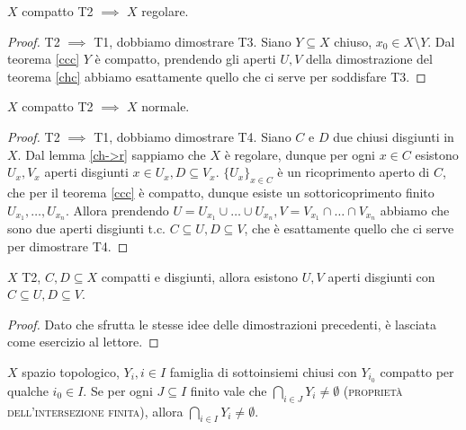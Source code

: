 \begin{lm} \label{ch->r}
  $X$ compatto T2 $\implies$ $X$ regolare.
\end{lm}

\begin{proof}
  T2 $\implies$ T1, dobbiamo dimostrare T3. Siano $Y \subseteq X$ chiuso, $x_0 \in X \setminus Y$. Dal teorema \ref{ccc} $Y$ è compatto, prendendo gli aperti $U, V$ della dimostrazione del teorema \ref{chc} abbiamo esattamente quello che ci serve per soddisfare T3.
\end{proof}

\begin{thm} \label{ch->n}
  $X$ compatto T2 $\implies$ $X$ normale.
\end{thm}

\begin{proof}
  T2 $\implies$ T1, dobbiamo dimostrare T4. Siano $C$ e $D$ due chiusi disgiunti in $X$. Dal lemma \ref{ch->r} sappiamo che $X$ è regolare, dunque per ogni $x \in C$ esistono $U_x, V_x$ aperti disgiunti $x \in U_x, D \subseteq V_x$. $\{U_x\}_{x \in C}$ è un ricoprimento aperto di $C$, che per il teorema \ref{ccc} è compatto, dunque esiste un sottoricoprimento finito $U_{x_1}, \dots, U_{x_n}$.
  Allora prendendo $U=U_{x_1} \cup \dots \cup U_{x_n}, V=V_{x_1} \cap \dots \cap V_{x_n}$ abbiamo che sono due aperti disgiunti t.c. $C \subseteq U, D \subseteq V$, che è esattamente quello che ci serve per dimostrare T4.
\end{proof}

\begin{prop}
  $X$ T2, $C, D \subseteq X$ compatti e disgiunti, allora esistono $U, V$ aperti disgiunti con $C \subseteq U, D \subseteq V$.
\end{prop}

\begin{proof}
  Dato che sfrutta le stesse idee delle dimostrazioni precedenti, è lasciata come esercizio al lettore.
\end{proof}

\begin{thm} \label{pif}
  $X$ spazio topologico, $Y_i, i \in I$ famiglia di sottoinsiemi chiusi con $Y_{i_0}$ compatto per qualche $i_0 \in I$. Se per ogni $J \subseteq I$ finito vale che $\displaystyle \bigcap_{i \in J} Y_i \not = \emptyset$ (\textsc{proprietà dell'intersezione finita}), allora $\displaystyle \bigcap_{i \in I} Y_i \not=\emptyset$.
\end{thm}

